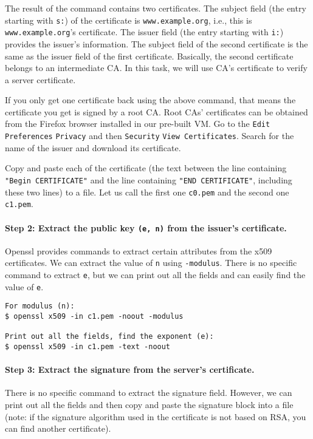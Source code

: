 The result of the command contains two certificates. The subject field (the entry starting with
\texttt{s:})  of the certificate is \texttt{www.example.org}, i.e.,
this is \texttt{www.example.org}'s certificate. The issuer field (the entry starting with 
\texttt{i:}) provides the issuer's information. The subject field of the second certificate 
is the same as the issuer field of the first certificate. Basically, the second certificate 
belongs to an intermediate CA. In this task, we will use CA's certificate to 
verify a server certificate.  

If you only get one certificate back using the above command, that means the certificate you
get is signed by a root CA. Root CAs' certificates can be obtained from the Firefox browser
installed in our pre-built VM.  Go to the \texttt{Edit}  \texttt{Preferences}
 \texttt{Privacy}  and then \texttt{Security}  \texttt{View Certificates}. 
Search for the name of the issuer and download its certificate.

Copy and paste each of the certificate (the text between the line
containing \texttt{"Begin CERTIFICATE"} and the line 
containing \texttt{"END CERTIFICATE"}, including these two lines) to a file. 
Let us call the first one \texttt{c0.pem} and
the second one \texttt{c1.pem}.  

 

\paragraph{Step 2: Extract the public key \texttt{(e, n)} from the issuer's certificate.}
Openssl provides commands to extract certain attributes from the x509 certificates. 
We can extract the value of \texttt{n} using \texttt{-modulus}. There is no specific 
command to extract \texttt{e}, but we can print out all the fields and can easily
find the value of \texttt{e}. 

\begin{lstlisting}
For modulus (n): 
$ openssl x509 -in c1.pem -noout -modulus

Print out all the fields, find the exponent (e): 
$ openssl x509 -in c1.pem -text -noout 
\end{lstlisting}


\paragraph{Step 3: Extract the signature from the server's certificate.}
There is no specific \openssl command to extract the signature field. 
However, we can print out all the fields and then copy and paste 
the signature block into a file (note: 
if the signature algorithm used in the certificate is not based on RSA, 
you can find another certificate). 


